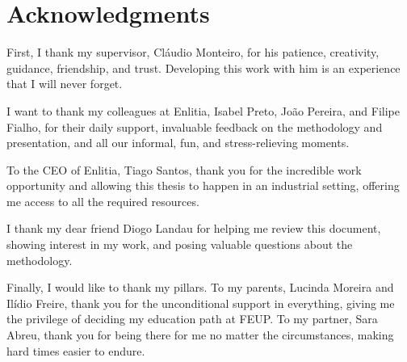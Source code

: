 \chapter*{Acknowledgments}

First, I thank my supervisor, Cláudio Monteiro, for his patience, creativity, guidance, friendship, and trust. Developing this work with him is an experience that I will never forget.

I want to thank my colleagues at Enlitia, Isabel Preto, João Pereira, and Filipe Fialho, for their daily support, invaluable feedback on the methodology and presentation, and all our informal, fun, and stress-relieving moments.

To the CEO of Enlitia, Tiago Santos, thank you for the incredible work opportunity and allowing this thesis to happen in an industrial setting, offering me access to all the required resources.

I thank my dear friend Diogo Landau for helping me review this document, showing interest in my work, and posing valuable questions about the methodology.

Finally, I would like to thank my pillars. To my parents, Lucinda Moreira and Ilídio Freire, thank you for the unconditional support in everything, giving me the privilege of deciding my education path at FEUP. To my partner, Sara Abreu, thank you for being there for me no matter the circumstances, making hard times easier to endure.

\vspace{10mm}
